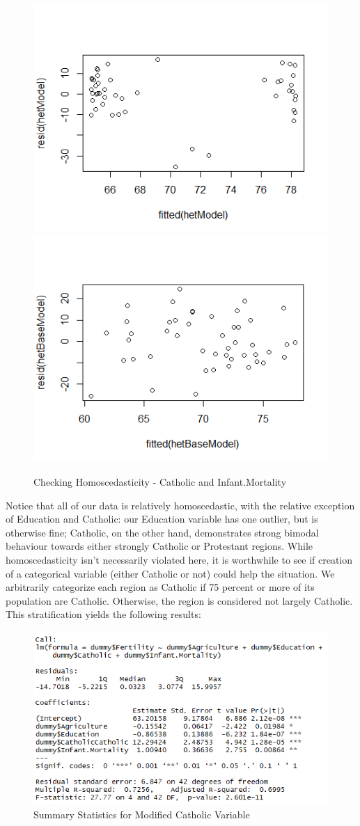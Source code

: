 \documentclass[preprint,12pt]{elsarticle}
\begin{document}
\begin{figure}[htp]
\includegraphics[width=.4\textwidth]{homoFertCath}\hfill
\includegraphics[width=.4\textwidth]{homoFertMort}
\caption{Checking Homoscedasticity - Catholic and Infant.Mortality}

\end{figure}

\noindent Notice that all of our data is relatively homoscedastic, with the relative exception of Education and Catholic: our Education variable has one outlier, but is otherwise fine; Catholic, on the other hand, demonstrates strong bimodal behaviour towards either strongly Catholic or Protestant regions. While homoscedasticity isn't necessarily violated here, it is worthwhile to see if creation of a categorical variable (either Catholic or not) could help the situation. We arbitrarily categorize each region as Catholic if 75 percent or more of its population are Catholic. Otherwise, the region is considered not largely Catholic. This stratification yields the following results:

\begin{figure}[h!]
\centering\includegraphics[width=0.7\linewidth]{SUmmaryStatsEndModel}
\caption{Summary Statistics for Modified Catholic Variable}
\end{figure}
\end{document}
